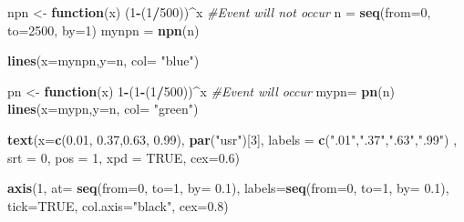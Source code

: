 \documentclass[12pt,twoside]{reedthesis}
\newenvironment{Shaded}{\begin{snugshade}}{\end{snugshade}}
\newcommand{\CommentTok}[1]{\textcolor[rgb]{0.56,0.35,0.01}{\textit{#1}}}
\newcommand{\ControlFlowTok}[1]{\textcolor[rgb]{0.13,0.29,0.53}{\textbf{#1}}}
\newcommand{\DataTypeTok}[1]{\textcolor[rgb]{0.13,0.29,0.53}{#1}}
\newcommand{\DecValTok}[1]{\textcolor[rgb]{0.00,0.00,0.81}{#1}}
\newcommand{\FloatTok}[1]{\textcolor[rgb]{0.00,0.00,0.81}{#1}}
\newcommand{\KeywordTok}[1]{\textcolor[rgb]{0.13,0.29,0.53}{\textbf{#1}}}
\newcommand{\NormalTok}[1]{#1}
\newcommand{\OperatorTok}[1]{\textcolor[rgb]{0.81,0.36,0.00}{\textbf{#1}}}
\newcommand{\OtherTok}[1]{\textcolor[rgb]{0.56,0.35,0.01}{#1}}
\newcommand{\StringTok}[1]{\textcolor[rgb]{0.31,0.60,0.02}{#1}}
\begin{document}
\begin{Shaded}
\begin{Highlighting}[]
\NormalTok{npn <-}\StringTok{ }\ControlFlowTok{function}\NormalTok{(x) (}\DecValTok{1}\OperatorTok{-}\NormalTok{(}\DecValTok{1}\OperatorTok{/}\DecValTok{500}\NormalTok{))}\OperatorTok{^}\NormalTok{x }\CommentTok{#Event will not occur}
\NormalTok{n =}\StringTok{ }\KeywordTok{seq}\NormalTok{(}\DataTypeTok{from=}\DecValTok{0}\NormalTok{, }\DataTypeTok{to=}\DecValTok{2500}\NormalTok{, }\DataTypeTok{by=}\DecValTok{1}\NormalTok{)}
\NormalTok{mynpn =}\StringTok{ }\KeywordTok{npn}\NormalTok{(n)}

\KeywordTok{lines}\NormalTok{(}\DataTypeTok{x=}\NormalTok{mynpn,}\DataTypeTok{y=}\NormalTok{n, }\DataTypeTok{col=} \StringTok{"blue"}\NormalTok{)}

\NormalTok{pn <-}\StringTok{ }\ControlFlowTok{function}\NormalTok{(x) }\DecValTok{1}\OperatorTok{-}\NormalTok{(}\DecValTok{1}\OperatorTok{-}\NormalTok{(}\DecValTok{1}\OperatorTok{/}\DecValTok{500}\NormalTok{))}\OperatorTok{^}\NormalTok{x }\CommentTok{#Event will occur}
\NormalTok{mypn=}\StringTok{ }\KeywordTok{pn}\NormalTok{(n)}
\KeywordTok{lines}\NormalTok{(}\DataTypeTok{x=}\NormalTok{mypn,}\DataTypeTok{y=}\NormalTok{n, }\DataTypeTok{col=} \StringTok{"green"}\NormalTok{)}

\KeywordTok{text}\NormalTok{(}\DataTypeTok{x=}\KeywordTok{c}\NormalTok{(}\FloatTok{0.01}\NormalTok{, }\FloatTok{0.37}\NormalTok{,}\FloatTok{0.63}\NormalTok{, }\FloatTok{0.99}\NormalTok{),  }\KeywordTok{par}\NormalTok{(}\StringTok{"usr"}\NormalTok{)[}\DecValTok{3}\NormalTok{], }\DataTypeTok{labels =} \KeywordTok{c}\NormalTok{(}\StringTok{".01"}\NormalTok{,}\StringTok{".37"}\NormalTok{,}\StringTok{".63"}\NormalTok{,}\StringTok{".99"}\NormalTok{) , }\DataTypeTok{srt =} \DecValTok{0}\NormalTok{, }\DataTypeTok{pos =} \DecValTok{1}\NormalTok{, }\DataTypeTok{xpd =} \OtherTok{TRUE}\NormalTok{, }\DataTypeTok{cex=}\FloatTok{0.6}\NormalTok{)}

\KeywordTok{axis}\NormalTok{(}\DecValTok{1}\NormalTok{, }\DataTypeTok{at=} \KeywordTok{seq}\NormalTok{(}\DataTypeTok{from=}\DecValTok{0}\NormalTok{, }\DataTypeTok{to=}\DecValTok{1}\NormalTok{, }\DataTypeTok{by=} \FloatTok{0.1}\NormalTok{), }\DataTypeTok{labels=}\KeywordTok{seq}\NormalTok{(}\DataTypeTok{from=}\DecValTok{0}\NormalTok{, }\DataTypeTok{to=}\DecValTok{1}\NormalTok{, }\DataTypeTok{by=} \FloatTok{0.1}\NormalTok{), }\DataTypeTok{tick=}\OtherTok{TRUE}\NormalTok{, }\DataTypeTok{col.axis=}\StringTok{"black"}\NormalTok{, }\DataTypeTok{cex=}\FloatTok{0.8}\NormalTok{)}


\end{Highlighting}
\end{Shaded}
\end{document}
